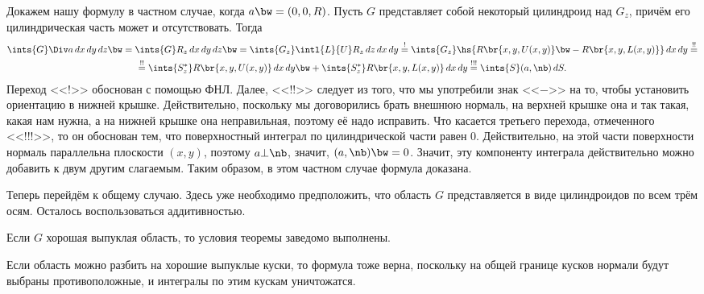 \documentclass[a4paper]{article}
\begin{document}
Докажем нашу формулу в частном случае, когда $a \bw= (0,0,R)$. Пусть $G$ представляет собой
некоторый цилиндроид над $G_z$, причём его цилиндрическая часть может и отсутствовать. Тогда
\begin{multline*}
\ints{G} \Div a \,d x \,d y \,d z \bw= \ints{G} R_z\,d x \,d y \,d z \bw=
\ints{G_z} \intl{L}{U}R_z \,dz \,dx \,dy \stackrel{!}{=}
\ints{G_z} \hs{R\br{x,y,U(x,y)} \bw- R\br{x,y, L(x,y)}} \,d x \,d y \stackrel{!!}{=}\\ \stackrel{!!}{=}
\ints{S^*_z}R\br{x,y,U(x,y)}\,d x\,d y \bw+ \ints{S^*_z}R\br{x,y,L(x,y)}\,d x\,d y \stackrel{!!!}{=}
\ints{S}(a,\nb)\,d S.
\end{multline*}
Переход <<!>> обоснован с помощью ФНЛ. Далее, <<!!>> следует из того, что мы употребили знак <<$-$>> на то,
чтобы установить ориентацию в нижней крышке. Действительно, поскольку мы договорились брать внешнюю нормаль,
на верхней крышке она и так такая, какая нам нужна, а на нижней крышке она неправильная, поэтому её надо
исправить. Что касается третьего перехода, отмеченного <<!!!>>, то он обоснован тем, что поверхностный
интеграл по цилиндрической части равен 0. Действительно, на этой части поверхности нормаль параллельна
плоскости $(x,y)$, поэтому $a \bot \nb$, значит, $(a,\nb) \bw= 0$. Значит, эту компоненту интеграла
действительно можно добавить к двум другим слагаемым. Таким образом, в этом частном случае формула доказана.

Теперь перейдём к общему случаю. Здесь уже необходимо предположить, что область $G$ представляется в
виде цилиндроидов по всем трём осям. Осталось воспользоваться аддитивностью.

\begin{imp}
Если $G$ хорошая выпуклая область, то условия теоремы заведомо выполнены.
\end{imp}

\begin{imp}
Если область можно разбить на хорошие выпуклые куски, то формула тоже верна, поскольку на общей границе кусков
нормали будут выбраны противоположные, и интегралы по этим кускам уничтожатся.
\end{imp}
\end{document}
